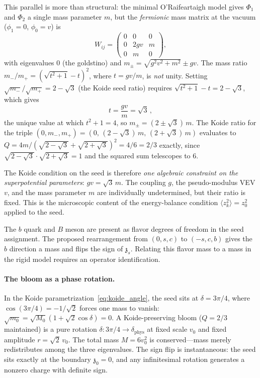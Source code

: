 \documentclass[12pt,a4paper]{article}
\newcommand{\zch}{\mathfrak{z}}
\begin{document}
This parallel is more than structural: the minimal O'Raifeartaigh
model gives $\Phi_1$ and $\Phi_2$ a single mass parameter $m$, but the
\emph{fermionic} mass matrix at the vacuum ($\phi_1 = 0$,
$\phi_0 = v$) is
\begin{equation*}
  W_{ij} = \begin{pmatrix} 0 & 0 & 0 \\ 0 & 2gv & m \\ 0 & m & 0 \end{pmatrix},
\end{equation*}
with eigenvalues $0$ (the goldstino) and $m_\pm = \sqrt{g^2v^2 + m^2} \pm gv$.
The mass ratio $m_-/m_+ = (\sqrt{t^2+1} - t)^2$, where $t = gv/m$,
is \emph{not} unity.  Setting $\sqrt{m_-}/\sqrt{m_+} = 2 - \sqrt{3}$
(the Koide seed ratio) requires $\sqrt{t^2+1} - t = 2 - \sqrt{3}$,
which gives
\begin{equation*}
  t = \frac{gv}{m} = \sqrt{3}\,,
\end{equation*}
the unique value at which $t^2 + 1 = 4$, so $m_\pm = (2 \pm \sqrt{3})\,m$.
The Koide ratio for the triple $(0, m_-, m_+) = (0,\, (2-\sqrt{3})\,m,
\, (2+\sqrt{3})\,m)$ evaluates to $Q = 4m/(\sqrt{2-\sqrt{3}} +
\sqrt{2+\sqrt{3}})^2 = 4/6 = 2/3$ exactly, since
$\sqrt{2-\sqrt{3}}\cdot\sqrt{2+\sqrt{3}} = 1$ and the squared sum
telescopes to $6$.

The Koide condition on the seed is therefore \emph{one algebraic
constraint on the superpotential parameters}: $gv = \sqrt{3}\,m$.
The coupling $g$, the pseudo-modulus VEV $v$, and the mass
parameter $m$ are individually undetermined, but their ratio is fixed.
This is the microscopic content of the energy-balance condition
$\langle z_k^2\rangle = z_0^2$ applied to the seed.

The $b$ quark and $B$ meson are present as flavor degrees of freedom in
the seed assignment. The proposed rearrangement from $(0,s,c)$ to
$(-s,c,b)$ gives the $b$ direction a mass and flips the sign of
$\zch_s$. Relating this flavor mass to a mass in the rigid model
requires an operator identification.

\paragraph{The bloom as a phase rotation.}
In the Koide parametrization~\eqref{eq:koide_angle}, the seed sits at
$\delta = 3\pi/4$, where $\cos(3\pi/4) = -1/\sqrt{2}$ forces one
mass to vanish: $\sqrt{m_0} = \sqrt{M_0}(1 + \sqrt{2}\cos\delta) = 0$.
A Koide-preserving bloom ($Q = 2/3$ maintained) is a pure rotation
$\delta: 3\pi/4 \to \delta_{\text{phys}}$ at fixed scale $v_0$
and fixed amplitude $r = \sqrt{2}\,v_0$. The total mass
$M = 6v_0^2$ is conserved---mass merely redistributes among the three
eigenvalues. The sign flip is instantaneous: the seed sits exactly at
the boundary $\zch_0 = 0$, and any infinitesimal rotation generates
a nonzero charge with definite sign.
\end{document}
